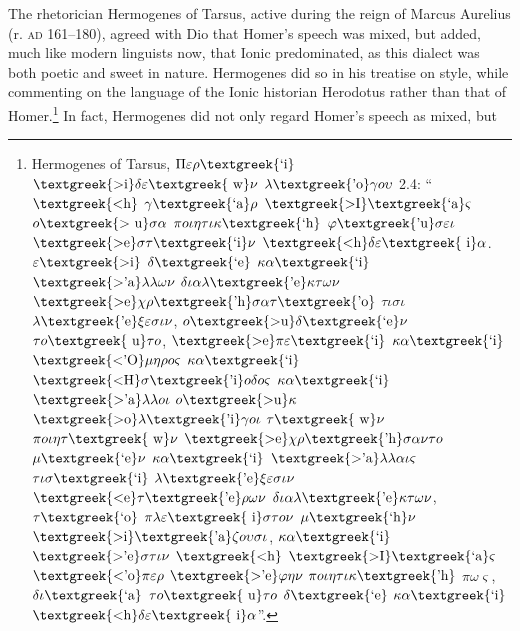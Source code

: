 \documentclass[output=paper]{langsci/langscibook}
\begin{document}
The rhetorician Hermogenes of Tarsus, active during the reign of Marcus Aurelius (r. \textsc{ad} 161–180), agreed with Dio that Homer’s speech was mixed, but added, much like modern linguists now, that Ionic predominated, as this dialect was both poetic and sweet in nature. Hermogenes did so in his treatise on style, while commenting on the language of the Ionic historian Herodotus rather than that of Homer.\footnote{Hermogenes of Tarsus, $\Pi \varepsilon \rho \text{\textgreek{`i}}$ $\text{\textgreek{>i}}\delta \varepsilon \text{\textgreek{~w}}\nu $ $\lambda \text{\textgreek{'o}}\gamma o\upsilon $ 2.4: “$\text{\textgreek{<h}}$ $\gamma \text{\textgreek{`a}}\rho $ $\text{\textgreek{>I}}\text{\textgreek{`a}}\varsigma $ $o\text{\textgreek{>~u}}\sigma \alpha $ $\pi o\iota \eta \tau \iota \kappa \text{\textgreek{`h}}$ $\varphi \text{\textgreek{'u}}\sigma \varepsilon \iota $ $\text{\textgreek{>e}}\sigma \tau \text{\textgreek{`i}}\nu $ $\text{\textgreek{<h}}\delta \varepsilon \text{\textgreek{~i}}\alpha $. $\varepsilon \text{\textgreek{>i}}$ $\delta \text{\textgreek{`e}}$ $\kappa \alpha \text{\textgreek{`i}}$ $\text{\textgreek{>'a}}\lambda \lambda \omega \nu $ $\delta \iota \alpha \lambda \text{\textgreek{'e}}\kappa \tau \omega \nu $ $\text{\textgreek{>e}}\chi \rho \text{\textgreek{'h}}\sigma \alpha \tau \text{\textgreek{'o}}$ $\tau \iota \sigma \iota $ $\lambda \text{\textgreek{'e}}\xi \varepsilon \sigma \iota \nu $, $o\text{\textgreek{>u}}\delta \text{\textgreek{`e}}\nu $ $\tau o\text{\textgreek{~u}}\tau o$, $\text{\textgreek{>e}}\pi \varepsilon \text{\textgreek{`i}}$ $\kappa \alpha \text{\textgreek{`i}}$ $\text{\textgreek{<'O}}\mu \eta \rho o\varsigma $ $\kappa \alpha \text{\textgreek{`i}}$ $\text{\textgreek{<H}}\sigma \text{\textgreek{'i}}o\delta o\varsigma $ $\kappa \alpha \text{\textgreek{`i}}$ $\text{\textgreek{>'a}}\lambda \lambda o\iota $ $o\text{\textgreek{>u}}\kappa $ $\text{\textgreek{>o}}\lambda \text{\textgreek{'i}}\gamma o\iota $ $\tau \text{\textgreek{~w}}\nu $ $\pi o\iota \eta \tau \text{\textgreek{~w}}\nu $ $\text{\textgreek{>e}}\chi \rho \text{\textgreek{'h}}\sigma \alpha \nu \tau o$ $\mu \text{\textgreek{`e}}\nu $ $\kappa \alpha \text{\textgreek{`i}}$ $\text{\textgreek{>'a}}\lambda \lambda \alpha \iota \varsigma $ $\tau \iota \sigma \text{\textgreek{`i}}$ $\lambda \text{\textgreek{'e}}\xi \varepsilon \sigma \iota \nu $ $\text{\textgreek{<e}}\tau \text{\textgreek{'e}}\rho \omega \nu $ $\delta \iota \alpha \lambda \text{\textgreek{'e}}\kappa \tau \omega \nu $, $\tau \text{\textgreek{`o}}$ $\pi \lambda \varepsilon \text{\textgreek{~i}}\sigma \tau o\nu $ $\mu \text{\textgreek{`h}}\nu $ $\text{\textgreek{>i}}\text{\textgreek{'a}}\zeta o\upsilon \sigma \iota $, $\kappa \alpha \text{\textgreek{`i}}$ $\text{\textgreek{>'e}}\sigma \tau \iota \nu $ $\text{\textgreek{<h}}$ $\text{\textgreek{>I}}\text{\textgreek{`a}}\varsigma $ $\text{\textgreek{<'o}}\pi \varepsilon \rho $ $\text{\textgreek{>'e}}\varphi \eta \nu $ $\pi o\iota \eta \tau \iota \kappa \text{\textgreek{'h}}$ $\pi \omega \varsigma $, $\delta \iota \text{\textgreek{`a}}$ $\tau o\text{\textgreek{~u}}\tau o$ $\delta \text{\textgreek{`e}}$ $\kappa \alpha \text{\textgreek{`i}}$ $\text{\textgreek{<h}}\delta \varepsilon \text{\textgreek{~i}}\alpha $”.} In fact, Hermogenes did not only regard Homer’s speech as mixed, but 
\end{document}
